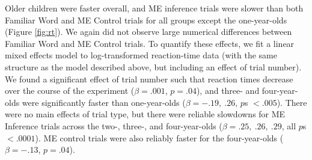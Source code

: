 \documentclass[man,noapacite]{apa2}
\begin{document}
Older children were faster overall, and ME inference trials were slower than both Familiar Word and ME Control trials for all groups except the one-year-olds (Figure \ref{fig:rt}). We again did not observe large numerical differences between Familiar Word and ME Control trials. To quantify these effects, we fit a linear mixed effects model to  log-transformed reaction-time data (with the same structure as the model described above, but including an effect of trial number). We found a significant effect of trial number such that reaction times decrease over the course of the experiment ($\beta = .001$, $p = .04$), and three- and four-year-olds were significantly faster than one-year-olds ($\beta = -.19,~.26$, $p$s $<.005$). There were no main effects of trial type, but there were reliable slowdowns for ME Inference trials across the two-, three-, and four-year-olds ($\beta=.25,~.26,~.29$, all $p$s $< .0001$). ME control trials were also reliably faster for the four-year-olds ($\beta=-.13$, $p=.04$). 

\end{document}
